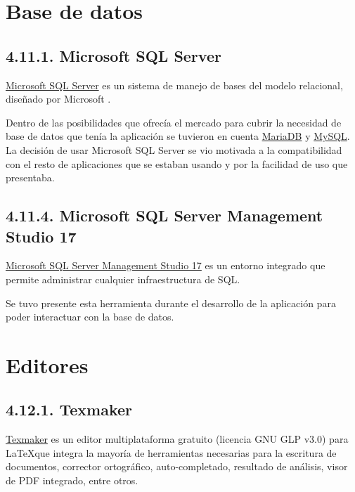 \section{Base de datos}

\subsection{4.11.1. Microsoft SQL Server}

\href{https://www.microsoft.com/es-es/sql-server/sql-server-2017}{Microsoft SQL Server} es un sistema de manejo de bases del modelo relacional, diseñado por Microsoft \cite{wiki:sqlServer}.

Dentro de las posibilidades que ofrecía el mercado para cubrir la necesidad de base de datos que tenía la aplicación se tuvieron en cuenta \href{https://mariadb.org/}{MariaDB} y \href{https://www.mysql.com/}{MySQL}. La decisión de usar Microsoft SQL Server se vio motivada a la compatibilidad con el resto de aplicaciones que se estaban usando y por la facilidad de uso que presentaba.

\subsection{4.11.4. Microsoft SQL Server Management Studio 17}

\href{https://docs.microsoft.com/es-es/sql/ssms/download-sql-server-management-studio-ssms?view=sql-server-2017}{Microsoft SQL Server Management Studio 17} es un entorno integrado que permite administrar cualquier infraestructura de SQL.

Se tuvo presente esta herramienta durante el desarrollo de la aplicación para poder interactuar con la base de datos.

\section{Editores}

\subsection{4.12.1. Texmaker}

\href{http://www.xm1math.net/texmaker/}{Texmaker} es un editor multiplataforma gratuito (licencia GNU GLP v3.0) para \LaTeX que integra la mayoría de herramientas necesarias para la escritura de documentos, corrector ortográfico, auto-completado, resultado de análisis, visor de PDF integrado, entre otros.

